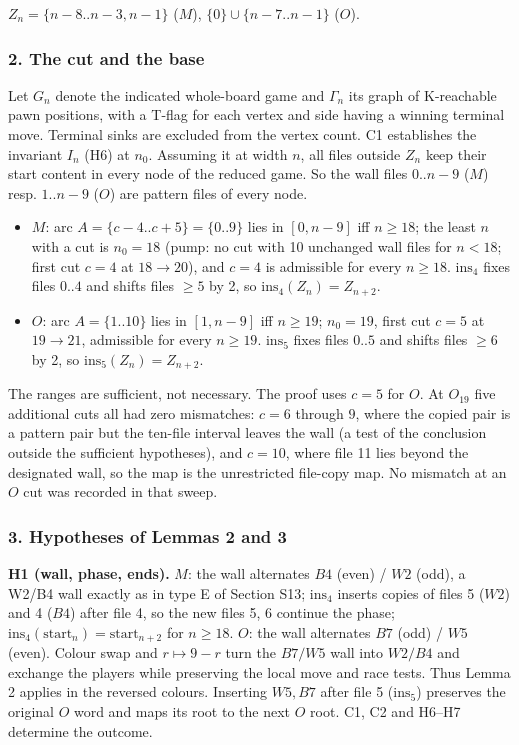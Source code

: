 $Z_n = \{n-8..n-3,n-1\}$ ($M$), $\{0\}\cup\{n-7..n-1\}$ ($O$).

\subsubsection*{2. The cut and the base}
Let $G_n$ denote the indicated whole-board game and $\Gamma_n$ its graph of K-reachable pawn positions, with a T-flag for each vertex and side having a winning terminal move. Terminal sinks are excluded from the vertex count. C1 establishes the invariant $I_n$ (H6) at $n_0$. Assuming it at width $n$, all files outside $Z_n$ keep their start content in every node of the reduced game. So the wall files $0..n-9$ ($M$) resp. $1..n-9$ ($O$) are pattern files of every node.

\begin{itemize}
\item $M$: arc $A=\{c-4..c+5\}=\{0..9\}$ lies in $[0,n-9]$ iff $n\ge18$; the least $n$ with a cut is $n_0=18$ (pump: no cut with 10 unchanged wall files for $n<18$; first cut $c=4$ at $18\to20$), and $c=4$ is admissible for every $n\ge18$. $\mathrm{ins}_4$ fixes files $0..4$ and shifts files $\ge5$ by 2, so $\mathrm{ins}_4(Z_n)=Z_{n+2}$.
\item $O$: arc $A=\{1..10\}$ lies in $[1,n-9]$ iff $n\ge19$; $n_0=19$, first cut $c=5$ at $19\to21$, admissible for every $n\ge19$. $\mathrm{ins}_5$ fixes files $0..5$ and shifts files $\ge6$ by 2, so $\mathrm{ins}_5(Z_n)=Z_{n+2}$.
\end{itemize}
The ranges are sufficient, not necessary. The proof uses $c=5$ for $O$. At $O_{19}$ five additional cuts all had zero mismatches: $c=6$ through $9$, where the copied pair is a pattern pair but the ten-file interval leaves the wall (a test of the conclusion outside the sufficient hypotheses), and $c=10$, where file 11 lies beyond the designated wall, so the map is the unrestricted file-copy map. No mismatch at an $O$ cut was recorded in that sweep.

\subsubsection*{3. Hypotheses of Lemmas 2 and 3}
\textbf{H1 (wall, phase, ends).} $M$: the wall alternates $B4$ (even) / $W2$ (odd), a W2/B4 wall exactly as in type E of Section S13; $\mathrm{ins}_4$ inserts copies of files 5 ($W2$) and 4 ($B4$) after file 4, so the new files 5, 6 continue the phase; $\mathrm{ins}_4(\mathrm{start}_n)=\mathrm{start}_{n+2}$ for $n\ge18$. $O$: the wall alternates $B7$ (odd) / $W5$ (even). Colour swap and $r\mapsto 9-r$ turn the $B7/W5$ wall into $W2/B4$ and exchange the players while preserving the local move and race tests. Thus Lemma 2 applies in the reversed colours. Inserting $W5,B7$ after file 5 ($\mathrm{ins}_5$) preserves the original $O$ word and maps its root to the next $O$ root. C1, C2 and H6--H7 determine the outcome.


